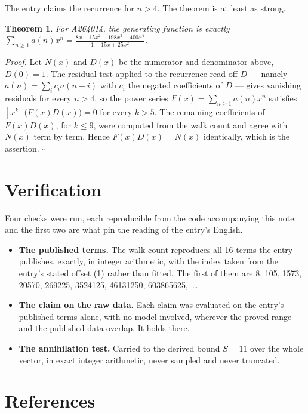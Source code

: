 \documentclass[11pt]{article}
\newtheorem{theorem}{Theorem}
\theoremstyle{definition}
\begin{document}
The entry claims the recurrence for $n > 4$. The theorem is at least as strong.

\begin{theorem} For A264014, the generating function is exactly $\sum_{n\ge 1} a(n)x^n = \frac{8x - 15x^{2} + 198x^{3} - 400x^{4}}{1 - 15x + 25x^{2}}$.\end{theorem}

{\itshape Proof.} Let $N(x)$ and $D(x)$ be the numerator and denominator above, $D(0)=1$. The residual test applied to the recurrence read off $D$ --- namely $a(n) = \sum_i c_i a(n-i)$ with $c_i$ the negated coefficients of $D$ --- gives vanishing residuals for every $n > 4$, so the power series $F(x)=\sum_{n\ge 1}a(n)x^n$ satisfies $[x^k]\bigl(F(x)D(x)\bigr) = 0$ for every $k > 5$. The remaining coefficients of $F(x)D(x)$, for $k \le 9$, were computed from the walk count and agree with $N(x)$ term by term. Hence $F(x)D(x) = N(x)$ identically, which is the assertion. $\square$

\section{Verification}

Four checks were run, each reproducible from the code accompanying this note, and the first two are what pin the reading of the entry's English.

\begin{itemize}

\item {\bfseries The published terms.} The walk count reproduces all 16 terms the entry publishes, exactly, in integer arithmetic, with the index taken from the entry's stated offset (1) rather than fitted. The first of them are 8, 105, 1573, 20570, 269225, 3524125, 46131250, 603865625,~\dots

\item {\bfseries The claim on the raw data.} Each claim was evaluated on the entry's published terms alone, with no model involved, wherever the proved range and the published data overlap. It holds there.

\item {\bfseries The annihilation test.} Carried to the derived bound $S = 11$ over the whole vector, in exact integer arithmetic, never sampled and never truncated.

\end{itemize}

\section{References}
\end{document}
